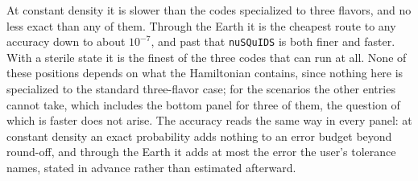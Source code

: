 \documentclass[final,5p,times,twocolumn,sort,compress]{elsarticle}
\begin{document}
At constant density it is slower than the codes specialized to three flavors, and no less exact than any of them.  Through the Earth it is the cheapest route to any accuracy down to about $10^{-7}$, and past that {\tt nuSQuIDS} is both finer and faster.  With a sterile state it is the finest of the three codes that can run at all.  None of these positions depends on what the Hamiltonian contains, since nothing here is specialized to the standard three-flavor case; for the scenarios the other entries cannot take, which includes the bottom panel for three of them, the question of which is faster does not arise.  The accuracy reads the same way in every panel: at constant density an exact probability adds nothing to an error budget beyond round-off, and through the Earth it adds at most the error the user's tolerance names, stated in advance rather than estimated afterward.
\end{document}

